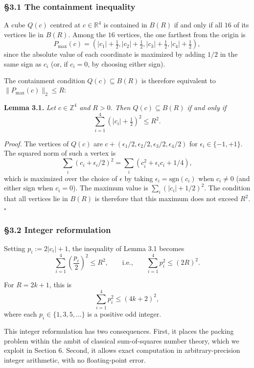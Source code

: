 \documentclass[a4paper,11pt]{article}
\theoremstyle{definition}
\begin{document}
\subsubsection{§3.1 The containment
inequality}\label{the-containment-inequality}

A cube \(Q(c)\) centred at \(c \in \mathbb{R}^4\) is contained in
\(B(R)\) if and only if all \(16\) of its vertices lie in \(B(R)\).
Among the \(16\) vertices, the one farthest from the origin is
\[P_{\max}(c) = \left(|c_1| + \tfrac{1}{2}, |c_2| + \tfrac{1}{2}, |c_3| + \tfrac{1}{2}, |c_4| + \tfrac{1}{2}\right),\]
since the absolute value of each coordinate is maximized by adding
\(1/2\) in the same sign as \(c_i\) (or, if \(c_i = 0\), by choosing
either sign).

The containment condition \(Q(c) \subseteq B(R)\) is therefore
equivalent to \(\|P_{\max}(c)\|_2 \le R\):

\textbf{Lemma 3.1.} \emph{Let \(c \in \mathbb{Z}^4\) and \(R > 0\). Then
\(Q(c) \subseteq B(R)\) if and only if}
\[\boxed{\;\sum_{i=1}^{4} \left(|c_i| + \tfrac{1}{2}\right)^2 \le R^2.\;}\]

\emph{Proof.} The vertices of \(Q(c)\) are
\(c + (\epsilon_1/2, \epsilon_2/2, \epsilon_3/2, \epsilon_4/2)\) for
\(\epsilon_i \in \{-1, +1\}\). The squared norm of such a vertex is
\[\sum_i (c_i + \epsilon_i/2)^2 = \sum_i (c_i^2 + \epsilon_i c_i + 1/4),\]
which is maximized over the choice of \(\epsilon\) by taking
\(\epsilon_i = \mathrm{sgn}(c_i)\) when \(c_i \neq 0\) (and either sign
when \(c_i = 0\)). The maximum value is \(\sum_i (|c_i| + 1/2)^2\). The
condition that all vertices lie in \(B(R)\) is therefore that this
maximum does not exceed \(R^2\). \(\square\)

\subsubsection{§3.2 Integer reformulation}\label{integer-reformulation}

Setting \(p_i := 2|c_i| + 1\), the inequality of Lemma 3.1 becomes
\[\sum_{i=1}^{4} \left(\frac{p_i}{2}\right)^2 \le R^2, \qquad \text{i.e.,} \qquad \sum_{i=1}^{4} p_i^2 \le (2R)^2.\]

For \(R = 2k+1\), this is \[\sum_{i=1}^{4} p_i^2 \le (4k+2)^2,\] where
each \(p_i \in \{1, 3, 5, \ldots\}\) is a positive odd integer.

This integer reformulation has two consequences. First, it places the
packing problem within the ambit of classical sum-of-squares number
theory, which we exploit in Section 6. Second, it allows exact
computation in arbitrary-precision integer arithmetic, with no
floating-point error.
\end{document}
